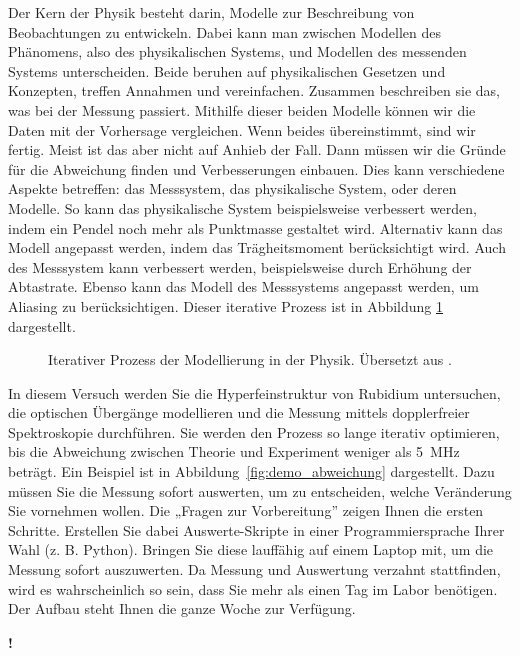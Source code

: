 Der Kern der Physik besteht darin, Modelle zur Beschreibung von Beobachtungen zu entwickeln. Dabei kann man zwischen Modellen des Phänomens, also des physikalischen Systems, und Modellen des messenden Systems unterscheiden. Beide beruhen auf physikalischen Gesetzen und Konzepten, treffen Annahmen und vereinfachen. Zusammen beschreiben sie das, was bei der Messung passiert. Mithilfe dieser beiden Modelle können wir die Daten mit der Vorhersage vergleichen. Wenn beides übereinstimmt, sind wir fertig. Meist ist das aber nicht auf Anhieb der Fall. Dann müssen wir die Gründe für die Abweichung finden und Verbesserungen einbauen. Dies kann verschiedene Aspekte betreffen: das Messsystem, das physikalische System, oder deren Modelle. So kann das physikalische System beispielsweise verbessert werden, indem ein Pendel noch mehr als Punktmasse gestaltet wird. Alternativ kann das Modell angepasst werden, indem das Trägheitsmoment berücksichtigt wird. Auch des Messsystem kann verbessert werden, beispielsweise durch Erhöhung der Abtastrate. Ebenso kann das Modell des Messsystems angepasst werden, um Aliasing zu berücksichtigen.  Dieser iterative Prozess ist in Abbildung \ref{fig:emf_diagramm} dargestellt.


\begin{figure}
	\caption{Iterativer Prozess der Modellierung in der Physik. Übersetzt aus  \cite{Lewandowski2018}.}
	\label{fig:emf_diagramm}	
\end{figure}

In diesem Versuch werden Sie die Hyperfeinstruktur von Rubidium untersuchen, die optischen Übergänge modellieren und die Messung mittels dopplerfreier Spektroskopie durchführen. Sie werden den Prozess so lange iterativ optimieren, bis die Abweichung zwischen Theorie und Experiment weniger als 5~MHz beträgt. Ein Beispiel ist in Abbildung~\ref{fig:demo_abweichung} dargestellt. Dazu müssen Sie die Messung sofort auswerten, um zu entscheiden, welche Veränderung Sie vornehmen wollen. Die „Fragen zur Vorbereitung” zeigen Ihnen die ersten Schritte. Erstellen Sie dabei Auswerte-Skripte in einer Programmiersprache Ihrer Wahl (z. B. Python). Bringen Sie diese lauffähig auf einem Laptop mit, um die Messung sofort auszuwerten. Da Messung und Auswertung verzahnt stattfinden, wird es wahrscheinlich so sein, dass Sie mehr als einen Tag im Labor benötigen. Der Aufbau steht Ihnen die ganze Woche zur Verfügung.
	\begin{marginfigure}[-13mm]{\Huge \textbf{!}}\end{marginfigure}



